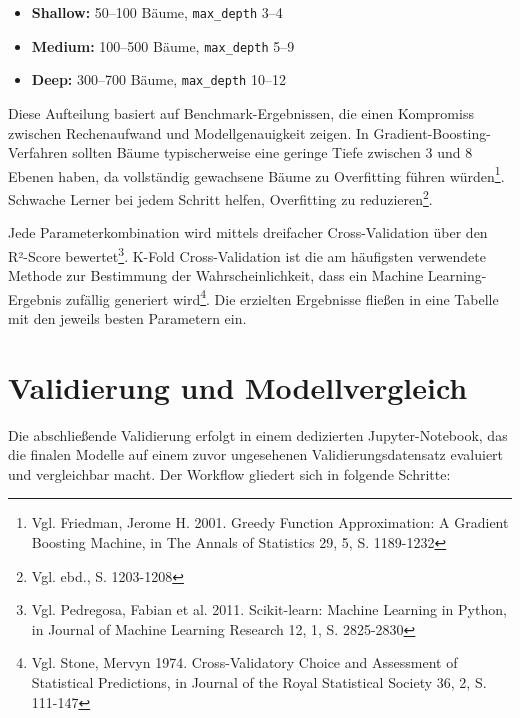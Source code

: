 \begin{itemize}
  \item \textbf{Shallow:} 50–100 Bäume, \texttt{max\_depth} 3–4
  \item \textbf{Medium:} 100–500 Bäume, \texttt{max\_depth} 5–9
  \item \textbf{Deep:} 300–700 Bäume, \texttt{max\_depth} 10–12
\end{itemize}

Diese Aufteilung basiert auf Benchmark-Ergebnissen, die einen Kompromiss zwischen Rechenaufwand und Modellgenauigkeit zeigen. In Gradient-Boosting-Verfahren sollten Bäume typischerweise eine geringe Tiefe zwischen 3 und 8 Ebenen haben, da vollständig gewachsene Bäume zu Overfitting führen würden\footnote{Vgl. Friedman, Jerome H. 2001. Greedy Function Approximation: A Gradient Boosting Machine, in The Annals of Statistics 29, 5, S. 1189-1232}. Schwache Lerner bei jedem Schritt helfen, Overfitting zu reduzieren\footnote{Vgl. ebd., S. 1203-1208}.

Jede Parameterkombination wird mittels dreifacher Cross-Validation über den R²-Score bewertet\footnote{Vgl. Pedregosa, Fabian et al. 2011. Scikit-learn: Machine Learning in Python, in Journal of Machine Learning Research 12, 1, S. 2825-2830}. K-Fold Cross-Validation ist die am häufigsten verwendete Methode zur Bestimmung der Wahrscheinlichkeit, dass ein Machine Learning-Ergebnis zufällig generiert wird\footnote{Vgl. Stone, Mervyn 1974. Cross-Validatory Choice and Assessment of Statistical Predictions, in Journal of the Royal Statistical Society 36, 2, S. 111-147}. Die erzielten Ergebnisse fließen in eine Tabelle mit den jeweils besten Parametern ein.

\section{Validierung und Modellvergleich}
\label{sec:validierung_modellvergleich}

Die abschließende Validierung erfolgt in einem dedizierten Jupyter-Notebook, das die finalen Modelle auf einem zuvor ungesehenen Validierungsdatensatz evaluiert und vergleichbar macht. Der Workflow gliedert sich in folgende Schritte:

